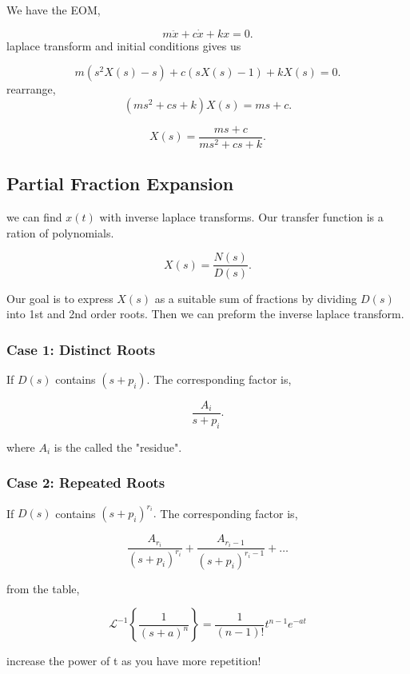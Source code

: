 \documentclass[12pt, a4paper]{report}
\begin{document}
  We have the EOM,

  \[
      m\ddot x + c \dot x + kx = 0
    .\]
  \noindent
  laplace transform and initial conditions gives us

  \[
      m(s ^2X(s) -s) + c(sX(s) - 1) + kX(s) = 0
    .\]
  \noindent
  rearrange,
  \[
      (ms ^2 + cs + k)X(s) = ms + c
    .\]

  \[
      X(s) = \frac{ms + c}{ms ^2 + cs + k}
    .\]

  \subsection{Partial Fraction Expansion}
  we can find $ x(t) $ with inverse laplace transforms. Our transfer function is a ration of polynomials.

  \[
      X(s) = \frac{N(s)}{D(s)}
    .\]

  \noindent

  Our goal is to express $ X(s)$ as a suitable sum of fractions by dividing $ D(s) $ into 1st and 2nd order roots. Then we can preform the inverse laplace transform.

  \subsubsection{Case 1: Distinct Roots}

  If $ D(s) $ contains $ (s + p_i). $ The corresponding factor is,

  \[
      \frac{A_i}{s + p_i}
    .\]

  where $ A_i $ is the called the "residue".

  \subsubsection{Case 2: Repeated Roots}

  If $ D(s) $ contains $ (s + p_i)^{r_i}. $ The corresponding factor is,

  \[
      \frac{A_{r_i}}{ \left( s + p_i \right)^{r_i} } + \frac{A_{r_i-1}}{ \left( s + p_i \right)^{r_{i}-1} } + \ldots
    \]

  from the table,

  \begin{equation}
    \mathcal{L}^{-1}\left\{\frac{1}{(s+a)^n}\right\} = \frac{1}{(n-1)!}t^{n-1}e^{-at}
  \end{equation}

  increase the power of t as you have more repetition!
\end{document}
